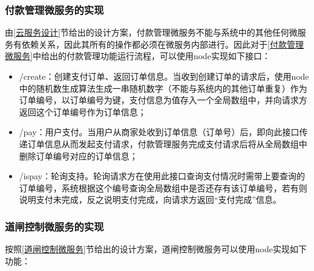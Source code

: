 \documentclass[a4paper]{ctexart}
\begin{document}
\subsubsection{付款管理微服务的实现}
由\ref{云服务设计}节给出的设计方案，付款管理微服务不能与系统中的其他任何微服务有依赖关系，因此其所有的操作都必须在微服务内部进行。因此对于\ref{付款管理微服务}中给出的付款管理功能运行流程，可以使用node实现如下接口：

\begin{itemize}
	\item /create：创建支付订单、返回订单信息。当收到创建订单的请求后，使用node中的随机数生成算法生成一串随机数字（不能与系统内的其他订单重复）作为订单编号，以订单编号为键，支付信息为值存入一个全局数组中，并向请求方返回这个订单编号作为订单信息；
	\item /pay：用户支付。当用户从商家处收到订单信息（订单号）后，即向此接口传递订单信息从而发起支付请求，付款管理服务完成支付请求后将从全局数组中删除订单编号对应的订单信息；
	\item /ispay：轮询支持。轮询请求方在使用此接口查询支付情况时需带上要查询的订单编号，系统根据这个编号查询全局数组中是否还存有该订单编号，若有则说明支付未完成，反之说明支付完成，向请求方返回“支付完成”信息。
\end{itemize}

\subsubsection{道闸控制微服务的实现}
按照\ref{道闸控制微服务}节给出的设计方案，道闸控制微服务可以使用node实现如下功能：
\end{document}
